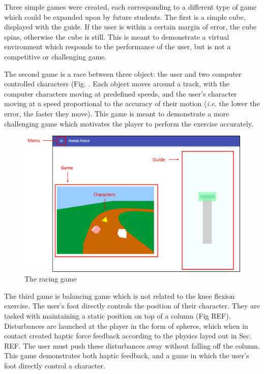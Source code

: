 \documentclass[12pt]{report}
\begin{document}
	Three simple games were created, each corresponding to a different type of game which could be expanded upon by future students. The first is a simple cube, displayed with the guide. If the user is within a certain margin of error, the cube spins, otherwise the cube is still. This is meant to demonstrate a virtual environment which responds to the performance of the user, but is not a competitive or challenging game. 
	
	The second game is a race between three object: the user and two computer controlled characters (Fig. . Each object moves around a track, with the computer characters moving at predefined speeds, and the user's character moving at a speed proportional to the accuracy of their motion (\textit{i.e.} the lower the error, the faster they move). This game is meant to demonstrate a more challenging game which motivates the player to perform the exercise accurately. 

	
	\begin{figure}[h] 
		\centering
		\includegraphics[width=\linewidth]{UI_game_label}
		\caption{The racing game}
		\label{fig:race}
	\end{figure} 
	

The third game is balancing game which is not related to the knee flexion exercise. The user's foot directly controls the position of their character. They are tasked with maintaining a static position on top of a column (Fig REF). Disturbances are launched at the player in the form of spheres, which when in contact created haptic force feedback according to the physics layed out in Sec. REF. The user must push these disturbances away without falling off the column. This game demonstrates both haptic feedback, and a game in which the user's foot directly control a character. 
			
\end{document}
